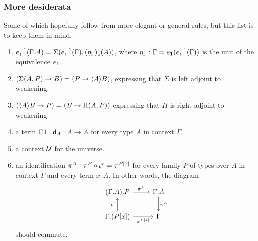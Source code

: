 \subsubsection*{More desiderata}
Some of which hopefully follow from more elegant or general rules, but
this list is to keep them in mind:
\begin{enumerate}
\item $\id{e_\unit^{-1}(\Gamma.A)}{\msm{e_\unit^{-1}(\Gamma)}{\trans{(\eta_\Gamma)}{A}}}$, where
$\eta_\Gamma:\id{\Gamma}{e_\unit(e_\unit^{-1}(\Gamma))}$ is the unit of the
equivalence $e_\unit$.  
\item $\id{(\msm{A}{P}\to B)}{(P\to \ctxwk{A}{B})}$, expressing that $\Sigma$ is
left adjoint to weakening.
\item $\id{(\ctxwk{A}{B}\to P)}{(B\to\mprd{A}{P})}$ expressing that $\Pi$ is
right adjoint to weakening.
\item a term $\Gamma\vdash\idfunc[A]:A\to A$ for every type $A$ in context $\Gamma$.
\item a context $\UU$ for the universe.
\item an identification $\id{\pi^A\circ \pi^P\circ\iota^x}{\pi^{\subst{x}{P}}}$ for every
family $P$ of types over $A$ in context $\Gamma$ and every term $x:A$. In other
words, the diagram
\begin{equation*}
\begin{tikzcd}
\ctxext{{\Gamma}{A}}{P} \ar{r}{\pi^P} & \ctxext{\Gamma}{A} \ar{d}{\pi^A}\\
\ctxext{\Gamma}{\subst{x}{P}} \ar{u}{\iota^x} \ar{r}[swap]{\pi^{\subst{x}{P}}} & \Gamma
\end{tikzcd}
\end{equation*}
should commute.
\begin{comment}
\item For $\Gamma:\ctx$, $\Gamma\vdash A:\type$, $\ctxext{\Gamma}{A}\vdash P
:\type$ and $\ctxext{{\Gamma}{A}}{P}\vdash Q:\type$, $x:A$ and $u:P$
we desire that $\typefont{nat{-}ev{-}subst}(Q,u,x):\id{Q[\iota^x][\tfev(u,x)]}{Q[u][x]}$.
\item A function
\begin{equation*}
\tfcomp:\terms{\mprd{P}{Q}}\to\prd{x:\terms{A}}\terms{\mprd{\subst{x}{P}}{Q[\iota^x]}}
\end{equation*}
which could possibly replace $\tfev$ because it could be that $\tfev$ is
definable in terms of $\tfcomp$. It should satisfy
\begin{equation*}
\id{\trans{\typefont{nat{-}ev{-}subst}(Q,u,x)}{\tfev(\tfcomp(f,x),\tfev(u,x))}}{\tfev(\lambda(\tfev(f,u)),x)},
\end{equation*}
which is a naturality condition. There should be an equivalence between
$\terms{\mprd{A}{P}}$ and a type consisting of those terms of $\prd{x:\terms{A}}\terms{\subst{x}{P}}$ which satisfy
a certain naturality condition. One could hope that by formulating this dependently
enough, it is possible to write down such a naturality in one line.
\end{comment}
\end{enumerate}
\endgroup

